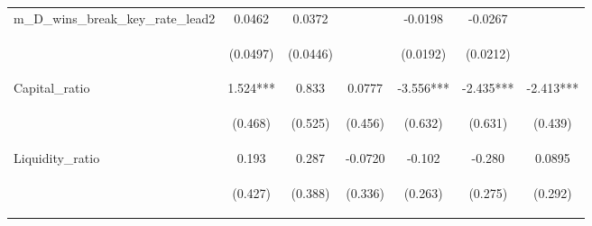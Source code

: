 \documentclass[]{article}
\begin{document}
\begin{center}
\begin{tabular}{lcccccc}
m\_D\_wins\_break\_key\_rate\_lead2 & 0.0462 & 0.0372 &  & -0.0198 & -0.0267 &  \\
\vspace{4pt} & \begin{footnotesize}(0.0497)\end{footnotesize} & \begin{footnotesize}(0.0446)\end{footnotesize} & \begin{footnotesize}\end{footnotesize} & \begin{footnotesize}(0.0192)\end{footnotesize} & \begin{footnotesize}(0.0212)\end{footnotesize} & \begin{footnotesize}\end{footnotesize} \\
Capital\_ratio & 1.524*** & 0.833 & 0.0777 & -3.556*** & -2.435*** & -2.413*** \\
\vspace{4pt} & \begin{footnotesize}(0.468)\end{footnotesize} & \begin{footnotesize}(0.525)\end{footnotesize} & \begin{footnotesize}(0.456)\end{footnotesize} & \begin{footnotesize}(0.632)\end{footnotesize} & \begin{footnotesize}(0.631)\end{footnotesize} & \begin{footnotesize}(0.439)\end{footnotesize} \\
Liquidity\_ratio & 0.193 & 0.287 & -0.0720 & -0.102 & -0.280 & 0.0895 \\
\vspace{4pt} & \begin{footnotesize}(0.427)\end{footnotesize} & \begin{footnotesize}(0.388)\end{footnotesize} & \begin{footnotesize}(0.336)\end{footnotesize} & \begin{footnotesize}(0.263)\end{footnotesize} & \begin{footnotesize}(0.275)\end{footnotesize} & \begin{footnotesize}(0.292)\end{footnotesize} \\

\end{tabular}
\end{center}
\end{document}
